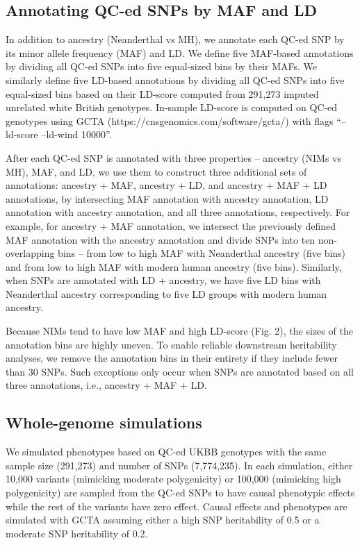 \subsection{Annotating QC-ed SNPs by MAF and LD}
In addition to ancestry (Neanderthal vs MH), we annotate each QC-ed SNP by its minor allele frequency (MAF) and LD. We define five MAF-based annotations by dividing all QC-ed SNPs into five equal-sized bins by their MAFs. We similarly define five LD-based annotations by dividing all QC-ed SNPs into five equal-sized bins based on their LD-score computed from 291,273 imputed unrelated white British genotypes. In-sample LD-score is computed on QC-ed genotypes using GCTA (https://cnsgenomics.com/software/gcta/)  with flags ``--ld-score --ld-wind 10000''.

After each QC-ed SNP is annotated with three properties -- ancestry (NIMs vs MH), MAF, and LD, we use them to construct three additional sets of annotations: ancestry + MAF, ancestry + LD, and ancestry + MAF + LD annotations, by intersecting MAF annotation with ancestry annotation, LD annotation with ancestry annotation, and all three annotations, respectively. For example, for ancestry + MAF annotation, we intersect the previously defined MAF annotation with the ancestry annotation and divide SNPs into ten non-overlapping bins -- from low to high MAF with Neanderthal ancestry (five bins) and from low to high MAF with modern human ancestry (five bins). Similarly, when SNPs are annotated with LD + ancestry, we have five LD bins with Neanderthal ancestry corresponding to five LD groups with modern human ancestry. 

Because NIMs tend to have low MAF and high LD-score (Fig. 2), the sizes of the annotation bins are highly uneven. To enable reliable downstream heritability analyses, we remove the annotation bins in their entirety if they include fewer than 30 SNPs. Such exceptions only occur when SNPs are annotated based on all three annotations, i.e., ancestry + MAF + LD. 

\subsection{Whole-genome simulations}
We simulated phenotypes based on QC-ed UKBB genotypes with the same sample size (291,273) and number of SNPs (7,774,235). In each simulation, either 10,000 variants (mimicking moderate polygenicity) or 100,000 (mimicking high polygenicity) are sampled from the QC-ed SNPs to have causal phenotypic effects while the rest of the variants have zero effect. Causal effects and phenotypes are simulated with GCTA assuming either a high SNP heritability of 0.5 or a moderate SNP heritability of 0.2.

